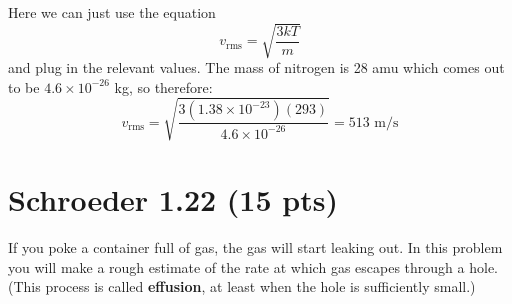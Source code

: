 \documentclass[11pt]{article}
\begin{document}
	\begin{solution}
		Here we can just use the equation 
		\[
			v_{\text{rms}} = \sqrt{\frac{3kT}{m}} 
		\] 
		and plug in the relevant values. The mass of nitrogen is 28 amu which comes out to be 
		$4.6 \times 10^{-26}$ kg, so therefore:
		\[
			v_{\text{rms}} = \sqrt{\frac{3(1.38 \times 10^{-23})(293)}{4.6 \times 10^{-26}}} = 513 \text{ m/s}
		\] 
	\end{solution}
	\pagebreak
	\section*{Schroeder 1.22 (15 pts)}
	If you poke a container full of gas, the gas will start leaking out. In this problem you will make a 
	rough estimate of the rate at which gas escapes through a hole. (This process is called \textbf{effusion}, 
	at least when the hole is sufficiently small.)	
\end{document}

